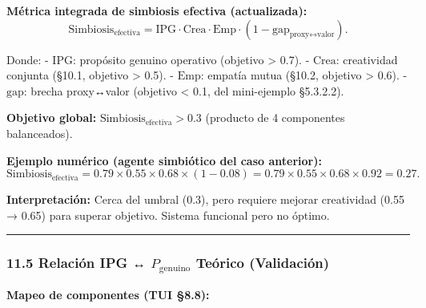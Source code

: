 \textbf{Métrica integrada de simbiosis efectiva (actualizada):} \[
\text{Simbiosis}_{\text{efectiva}} = \mathrm{IPG} \cdot \text{Crea} \cdot \text{Emp} \cdot (1 - \text{gap}_{\text{proxy}\leftrightarrow\text{valor}}).
\]

Donde: - \(\mathrm{IPG}\): propósito genuino operativo (objetivo
\textgreater{} 0.7). - \(\text{Crea}\): creatividad conjunta (§10.1,
objetivo \textgreater{} 0.5). - \(\text{Emp}\): empatía mutua (§10.2,
objetivo \textgreater{} 0.6). - \(\text{gap}\): brecha proxy↔valor
(objetivo \textless{} 0.1, del mini-ejemplo §5.3.2.2).

\textbf{Objetivo global:} \(\text{Simbiosis}_{\text{efectiva}} > 0.3\)
(producto de 4 componentes balanceados).

\textbf{Ejemplo numérico (agente simbiótico del caso anterior):} \[
\text{Simbiosis}_{\text{efectiva}} = 0.79 \times 0.55 \times 0.68 \times (1 - 0.08) = 0.79 \times 0.55 \times 0.68 \times 0.92 = 0.27.
\]

\textbf{Interpretación:} Cerca del umbral (0.3), pero requiere mejorar
creatividad (0.55 → 0.65) para superar objetivo. Sistema funcional pero
no óptimo.

\begin{center}\rule{0.5\linewidth}{0.5pt}\end{center}

\subsubsection{\texorpdfstring{11.5 Relación IPG ↔
\(P_{\text{genuino}}\) Teórico
(Validación)}{11.5 Relación IPG ↔ P\_\{\textbackslash text\{genuino\}\} Teórico (Validación)}}\label{relaciuxf3n-ipg-p_textgenuino-teuxf3rico-validaciuxf3n}

\textbf{Mapeo de componentes (TUI §8.8):}

